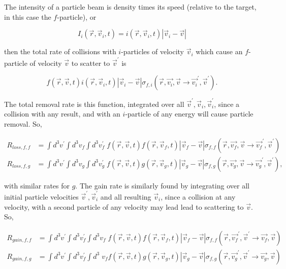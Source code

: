 \documentclass{hw-template}
\begin{document}
The intensity of a particle beam is density times its speed (relative to the target, in this case the $f$-particle), or

\begin{equation}
    I_i(\vec{r}, \vec{v}_i, t) = i(\vec{r}, \vec{v}_i, t) |\vec{v}_i - \vec{v}|
\end{equation}

then the total rate of collisions with $i$-particles of velocity $\vec{v}_i$ which cause an $f$-particle of velocity $\vec{v}$ to scatter to $\vec{v}^\prime$ is

\begin{equation}
    f(\vec{r}, \vec{v}, t)i(\vec{r}, \vec{v}_i, t) |\vec{v}_i - \vec{v}|\sigma_{f, i}(\vec{r}, \vec{v_i}, \vec{v} \rightarrow \vec{v_i}^\prime, \vec{v}^\prime).
\end{equation}

The total removal rate is this function, integrated over all $\vec{v}^\prime, \vec{v}_i, \vec{v}_i^\prime$, since a collision with any result, and with an $i$-particle of any energy will cause particle removal. So,

\begin{align}
    R_{loss, f, f} &= \int d^3 v^\prime \int d^3 v_f \int d^3 v_f^\prime \; f(\vec{r}, \vec{v}, t)f(\vec{r}, \vec{v}_f, t) |\vec{v}_f - \vec{v}|\sigma_{f, f}(\vec{r}, \vec{v_f}, \vec{v} \rightarrow \vec{v_f}^\prime, \vec{v}^\prime)\\
    R_{loss, f, g} &= \int d^3 v^\prime \int d^3 v_g \int d^3 v_g^\prime \; f(\vec{r}, \vec{v}, t)g(\vec{r}, \vec{v}_g, t) |\vec{v}_g - \vec{v}|\sigma_{f, g}(\vec{r}, \vec{v_g}, \vec{v} \rightarrow \vec{v_g}^\prime, \vec{v}^\prime),
\end{align}

with similar rates for $g$. The gain rate is similarly found by integrating over all initial particle velocities $\vec{v}^\prime, \vec{v}_i^\prime$ and all resulting $\vec{v}_i$, since a collision at any velocity, with a second particle of any velocity may lead lead to scattering to $\vec{v}$. So,

\begin{align}
    R_{gain, f, f} &= \int d^3 v^\prime  \int d^3 v_f^\prime \int d^3  v_f\; f(\vec{r}, \vec{v}, t) f(\vec{r}, \vec{v}_f, t) |\vec{v}_f - \vec{v}|\sigma_{f, f}(\vec{r}, \vec{v_f}^\prime, \vec{v}^\prime \rightarrow \vec{v_f}, \vec{v})\\
    R_{gain, f, g} &= \int d^3 v^\prime  \int d^3 v_f^\prime \int d^3 \; v_f f(\vec{r}, \vec{v}, t) g(\vec{r}, \vec{v}_g, t) |\vec{v}_g - \vec{v}|\sigma_{f, g}(\vec{r}, \vec{v_g}^\prime, \vec{v}^\prime \rightarrow \vec{v_g}, \vec{v})
\end{align}
\end{document}
